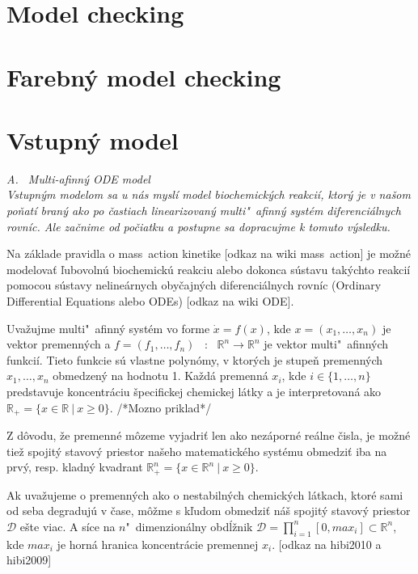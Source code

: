 \documentclass[11pt,final,oneside]{fithesis}
\begin{document}
\section{Model checking}
\label{model_checking}

\section{Farebn\' y model checking}

\section{Vstupn\'y model}%

\it A. \ Multi-afinn\'y ODE model\rm
\\

Vstupn\'ym modelom sa u n\'as mysl\'i model biochemick\'ych reakci\'i, ktor\'y je v na\v som po\v nat\'i bran\'y ako po \v castiach linearizovan\'y 
multi"~afinn\'y syst\'em diferenci\'alnych rovn\'ic. Ale za\v cnime od po\v ciatku a postupne sa dopracujme k tomuto v\'ysledku.

Na z\'aklade pravidla o mass~action kinetike [odkaz na wiki mass~action] je mo\v zn\'e modelova\v t \v lubovoln\'u biochemick\'u reakciu alebo dokonca 
s\'ustavu tak\'ychto reakci\'i pomocou s\'ustavy neline\'arnych oby\v cajn\'ych diferenci\'alnych rovn\'ic 
(Ordinary Differential Equations alebo ODEs) [odkaz na wiki ODE].

Uva\v zujme multi"~afinn\'y syst\'em vo forme $\dot{x} = f(x)$, kde $x = (x_1,\dots{},x_n)$ je vektor premenn\'ych a $f = (f_1,\dots{},f_n)$ \ : \ 
$\mathbb{R}^n \rightarrow \mathbb{R}^n$ je vektor multi"~afin\-n\'ych funkci\'i. Tieto funkcie s\'u vlastne polyn\'omy, v ktor\'ych je stupe\v n premenn\'ych 
$x_1,\dots{},x_n$ obmedzen\'y na hodnotu 1. Ka\v zd\'a premenn\'a $x_i$, kde $i \in \{1,\dots{},n\}$ predstavuje koncentr\'aciu \v specifickej chemickej l\'atky a je interpretovan\'a ako
{$\mathbb{R}_+ = \lbrace{}  x \in \mathbb{R}\ |\ {}x \geq 0  \rbrace$}. /*Mozno priklad*/

Z d\^ ovodu, \v ze premenn\'e m\^ ozeme vyjadri\v t len ako nez\'aporn\'e re\'alne \v cisla, je mo\v zn\'e tie\v z spojit\'y stavov\'y priestor na\v seho 
matematick\'eho syst\'emu obmedzi\v t iba na prv\'y, resp. kladn\'y kvadrant {$\mathbb{R}_+^n = \lbrace{}  x \in \mathbb{R}^n\ |\ {}x \geq 0  \rbrace$}.

Ak uva\v zujeme o premenn\'ych ako o nestabiln\'ych chemick\'ych l\'atkach, ktor\'e sami od seba degraduj\'u v \v case, m\^ o\v zme s k\v ludom obmedzi\v t 
n\'a\v s spojit\'y stavov\'y priestor $\mathcal{D}$ e\v ste viac. A s\'ice na $n$"~dimenzion\'alny obd\'l\v znik $\mathcal{D} = \prod_{i=1}^n[0,max_i] 
\subset \mathbb{R}^n$, kde $max_i$ je horn\'a hranica koncentr\'acie pre\-men\-nej $x_i$. [odkaz na hibi2010 a hibi2009]
\\
\end{document}
